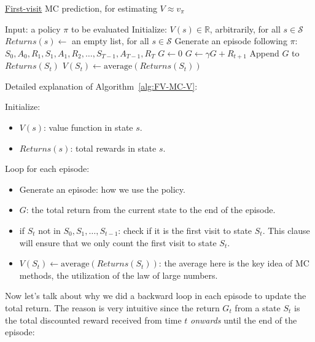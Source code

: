 \begin{algorithm}
    \caption{\hyperref[sec:fv-ev]{First-visit} MC prediction, for estimating $V \approx v_\pi$}\label{alg:FV-MC-V}
    \begin{algorithmic}
        \State Input: a policy $\pi$ to be evaluated
        \State Initialize:
        \State \hspace{\algorithmicindent} $V(s) \in \mathbb{R}$, arbitrarily, for all $s \in \mathcal{S}$
        \State \hspace{\algorithmicindent} $Returns(s) \leftarrow$ an empty list, for all $s \in \mathcal{S}$
        \State Generate an episode following $\pi$: $S_0, A_0, R_1, S_1, A_1, R_2, \dots, S_{T-1}, A_{T-1}, R_T$
        \State $G \leftarrow 0$
        \State $G \leftarrow \gamma G + R_{t+1}$
        \State Append $G$ to $Returns(S_t)$
        \State $V(S_t) \leftarrow \text{average}(Returns(S_t))$
        \EndIf
        \EndFor
        \EndLoop
    \end{algorithmic}
\end{algorithm}

Detailed explanation of Algorithm~\ref{alg:FV-MC-V}:

Initialize:
\begin{itemize}
    \item $V(s)$: value function in state $s$.
    \item $Returns(s)$: total rewards in state $s$.
\end{itemize}

Loop for each episode:
\begin{itemize}
    \item Generate an episode: how we use the policy.
    \item $G$:  the total return from the current state to the end of the episode.
    \item if $S_t$ not in $S_0, S_1, \dots, S_{t-1}$: check if it is the first visit to state $S_t$. This clause will ensure that we only count the first visit to state $S_t$.
    \item $V(S_t) \leftarrow \text{average}(Returns(S_t))$: the average here is the key idea of MC methods, the utilization of the law of large numbers.
\end{itemize}

Now let's talk about why we did a backward loop in each episode to update the total return. The reason is very intuitive since the return $G_t$ from a state $S_t$ is the total discounted reward received from time $t$ \emph{onwards} until the end of the episode:

